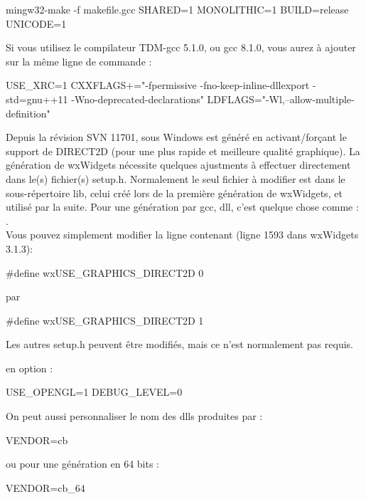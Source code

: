\begin{cmd}
mingw32-make -f makefile.gcc SHARED=1 MONOLITHIC=1 BUILD=release UNICODE=1
\end{cmd}

Si vous utilisez le compilateur TDM-gcc 5.1.0, ou gcc 8.1.0, vous aurez à ajouter sur la même ligne de commande : 
\begin{cmd}
USE_XRC=1
CXXFLAGS+="-fpermissive -fno-keep-inline-dllexport -std=gnu++11
 -Wno-deprecated-declarations"
LDFLAGS="-Wl,--allow-multiple-definition"
\end{cmd}  

Depuis la révision SVN 11701, \codeblocks sous Windows est généré en activant/forçant le support de DIRECT2D (pour une plus rapide et meilleure qualité graphique). La génération de wxWidgets nécessite quelques ajustments à effectuer directement dans le(s) fichier(s) setup.h. Normalement le seul fichier à modifier est dans le sous-répertoire lib, celui créé lors de la première génération de wxWidgets, et utilisé par la suite. Pour une génération par gcc, dll, c'est quelque chose comme : .\\
Vous pouvez simplement modifier la ligne contenant (ligne 1593 dans wxWidgets 3.1.3):
\begin{code}
    #define wxUSE_GRAPHICS_DIRECT2D 0 
\end{code}
par
\begin{code}
    #define wxUSE_GRAPHICS_DIRECT2D 1  
\end{code}
Les autres setup.h peuvent être modifiés, mais ce n'est normalement pas requis.

en option :
\begin{cmd}
USE_OPENGL=1
DEBUG_LEVEL=0
\end{cmd}


On peut aussi personnaliser le nom des dlls produites par :
\begin{cmd}
VENDOR=cb
\end{cmd}
ou pour une génération en 64 bits :
\begin{cmd}
VENDOR=cb_64
\end{cmd}


